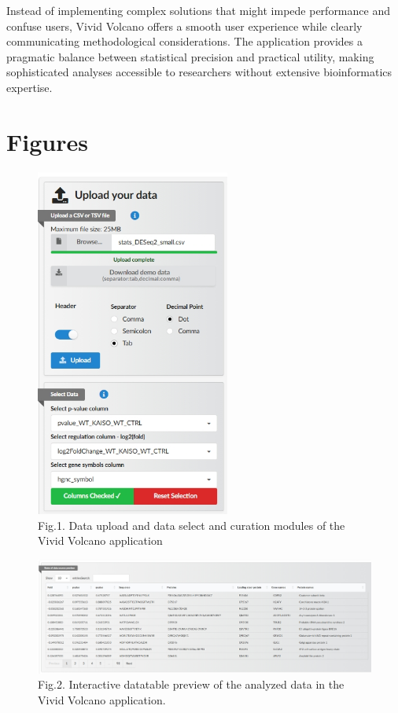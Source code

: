 \documentclass[
]{article}
\begin{document}
Instead of implementing complex solutions that might impede performance
and confuse users, Vivid Volcano offers a smooth user experience while
clearly communicating methodological considerations. The application
provides a pragmatic balance between statistical precision and practical
utility, making sophisticated analyses accessible to researchers without
extensive bioinformatics expertise.

\section{Figures}\label{figures}

\begin{figure}
\centering
\includegraphics[width=2.51042in,height=\textheight]{Paper_figures/Data_upload_and_curation.jpeg}
\caption{Fig.1. Data upload and data select and curation modules of the
Vivid Volcano application}
\end{figure}

\begin{figure}
\centering
\includegraphics{Paper_figures/Data_preview.jpeg}
\caption{Fig.2. Interactive datatable preview of the analyzed data in
the Vivid Volcano application.}
\end{figure}
\end{document}
